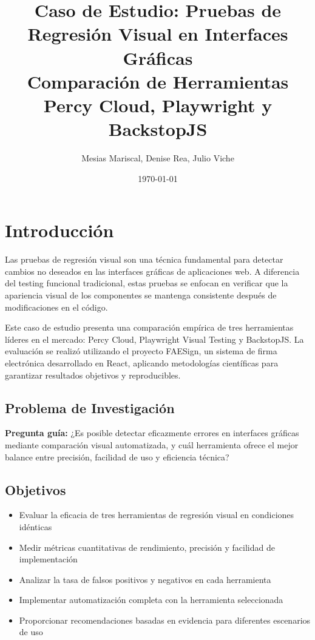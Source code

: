 \documentclass{article}
\title{Caso de Estudio: Pruebas de Regresión Visual en Interfaces Gráficas\\
\large Comparación de Herramientas Percy Cloud, Playwright y BackstopJS}
\author{Mesias Mariscal, Denise Rea, Julio Viche}
\date{\today}
\begin{document}
\maketitle

\section{Introducción}

Las pruebas de regresión visual son una técnica fundamental para detectar cambios no deseados en las interfaces gráficas de aplicaciones web. A diferencia del testing funcional tradicional, estas pruebas se enfocan en verificar que la apariencia visual de los componentes se mantenga consistente después de modificaciones en el código.

Este caso de estudio presenta una comparación empírica de tres herramientas líderes en el mercado: Percy Cloud, Playwright Visual Testing y BackstopJS. La evaluación se realizó utilizando el proyecto FAESign, un sistema de firma electrónica desarrollado en React, aplicando metodologías científicas para garantizar resultados objetivos y reproducibles.

\subsection{Problema de Investigación}
\textbf{Pregunta guía:} ¿Es posible detectar eficazmente errores en interfaces gráficas mediante comparación visual automatizada, y cuál herramienta ofrece el mejor balance entre precisión, facilidad de uso y eficiencia técnica?

\subsection{Objetivos}
\begin{itemize}[nosep]
\item Evaluar la eficacia de tres herramientas de regresión visual en condiciones idénticas
\item Medir métricas cuantitativas de rendimiento, precisión y facilidad de implementación
\item Analizar la tasa de falsos positivos y negativos en cada herramienta
\item Implementar automatización completa con la herramienta seleccionada
\item Proporcionar recomendaciones basadas en evidencia para diferentes escenarios de uso
\end{itemize}
\end{document}
